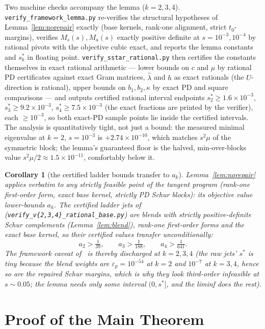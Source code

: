 \documentclass[11pt]{article}
\newtheorem{corollary}[theorem]{Corollary}
\newcommand{\eps}{\varepsilon}
\newcommand{\lam}{\lambda}
\begin{document}
Two machine checks accompany the lemma ($k=2,3,4$).
\texttt{verify\_framework\_lemma.py} re-verifies the structural hypotheses
of Lemma~\ref{lem:norepair} exactly (base kernels, rank-one alignment,
strict $t_0$-margins), verifies $M_s(s),M_a(s)$ exactly positive definite
at $s=10^{-3},10^{-4}$ by rational pivots with the objective cubic exact,
and reports the lemma constants and $s^\ast_k$ in floating point.
\texttt{verify\_sstar\_rational.py} then certifies the constants
themselves in exact rational arithmetic --- lower bounds on $c$ and $\mu$
by rational PD certificates against exact Gram matrices, $\hat\lam$ and
$h$ as exact rationals (the $U$-direction is rational), upper bounds on
$b_1,b_2,\kappa$ by exact PD and square comparisons --- and outputs
certified rational interval endpoints
$s^\ast_2\ge1.6\times10^{-3}$, $s^\ast_3\ge9.2\times10^{-3}$,
$s^\ast_4\ge7.5\times10^{-3}$ (the exact fractions are printed by the
verifier), each $\ge10^{-3}$, so both exact-PD sample points lie inside
the certified intervals. The analysis is
quantitatively tight, not just a bound: the measured minimal eigenvalue at
$k=2$, $s=10^{-3}$ is $+2.74\times10^{-10}$, which matches $s^2\mu$ of the
symmetric block; the lemma's guaranteed floor is the halved, min-over-blocks
value $s^2\mu/2\approx1.5\times10^{-11}$, comfortably below it.

\begin{corollary}[the certified ladder bounds transfer to $a_k$]
\label{cor:ladder}
Lemma~\ref{lem:norepair} applies verbatim to any strictly feasible point
of the tangent program (rank-one first-order form, exact base kernel,
strictly PD Schur blocks): its objective value lower-bounds $a_k$. The
certified ladder jets of~\cite{overshoot}
(\texttt{verify\_v\{2,3,4\}\_rational\_base.py}) are blends with strictly
positive-definite Schur complements (Lemma~\ref{lem:blend}), rank-one
first-order forms and the exact base kernel, so their certified values
transfer unconditionally:
\[
a_2>\tfrac1{39},\qquad a_3>\tfrac1{188},\qquad a_4>\tfrac1{641}.
\]
The framework caveat of~\cite{overshoot} is thereby discharged at
$k=2,3,4$ (the raw jets' $s^\ast$ is tiny because the blend weights are
$\eps_p=10^{-54}$ at $k=2$ and $10^{-7}$ at $k=3,4$, hence so are the
repaired Schur margins, which is why they \emph{look} third-order
infeasible at $s\sim0.05$; the lemma needs only some interval
$(0,s^\ast]$, and the liminf does the rest).
\end{corollary}

\section{Proof of the Main Theorem}\label{sec:assembly}
\end{document}
